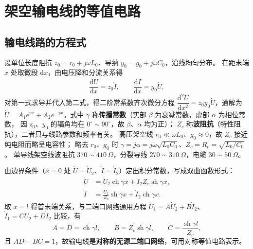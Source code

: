 
\section{架空输电线的等值电路}

\subsection{输电线路的方程式}

设单位长度阻抗 $z_0=r_0+j\omega L_0$、导纳 $y_0=g_0+j\omega C_0$，沿线均匀分布。
在距末端 $x$ 处取微段 $\mathrm{d}x$，由电压降和分流关系得
\begin{equation}
  \frac{\mathrm{d}\dot U}{\mathrm{d}x}=z_0\dot I,\qquad
  \frac{\mathrm{d}\dot I}{\mathrm{d}x}=y_0\dot U ,
\end{equation}
对第一式求导并代入第二式，得二阶常系数齐次微分方程
$\dfrac{\mathrm{d}^{2}\dot U}{\mathrm{d}x^{2}}=z_0y_0\dot U$，通解为
$\dot U=A_1e^{\gamma x}+A_2e^{-\gamma x}$。式中
$\gamma$ 称\textbf{传播常数}（实部 $\beta$ 为衰减常数，虚部 $\alpha$ 为相位常数，
因 $z_0$、$y_0$ 的辐角均在 $0^\circ\sim90^\circ$，故 $\beta$、$\alpha$ 均为正）；
$Z_c$ 称\textbf{波阻抗}（特性阻抗），二者只与线路参数和频率有关。
高压架空线 $r_0\ll\omega L_0$、$g_0\approx0$，故 $Z_c$ 接近纯电阻而略呈电容性；
略去 $r_0$、$g_0$ 时 $\gamma=j\alpha=j\omega\sqrt{L_0C_0}$、$Z_c=R_c=\sqrt{L_0/C_0}$。
单导线架空线波阻抗 $370\sim410\ \Omega$，分裂导线 $270\sim310\ \Omega$，电缆 $30\sim50\ \Omega$。

由边界条件（$x=0$ 处 $\dot U=\dot U_2$、$\dot I=\dot I_2$）定出积分常数，写成双曲函数形式：
\begin{align}
  \dot U&=\dot U_2\operatorname{ch}\gamma x+\dot I_2Z_c\operatorname{sh}\gamma x,\\
  \dot I&=\frac{\dot U_2}{Z_c}\operatorname{sh}\gamma x+\dot I_2\operatorname{ch}\gamma x .
\end{align}
取 $x=l$ 得首末端关系，与二端口网络通用方程
$\dot U_1=A\dot U_2+B\dot I_2$、$\dot I_1=C\dot U_2+D\dot I_2$ 比较，有
\begin{equation}
  A=D=\operatorname{ch}\gamma l,\qquad B=Z_c\operatorname{sh}\gamma l,\qquad
  C=\frac{\operatorname{sh}\gamma l}{Z_c},
\end{equation}
且 $AD-BC=1$，故输电线是\textbf{对称的无源二端口网络}，可用对称等值电路表示。

